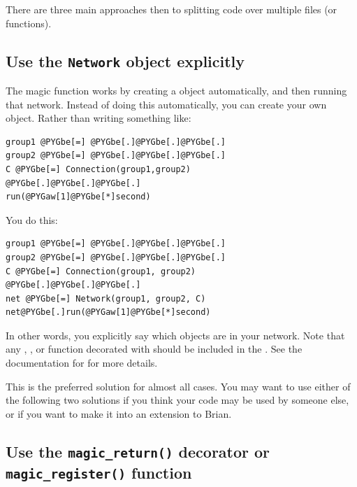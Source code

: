 \documentclass[letterpaper,10pt,english]{manual}
\begin{document}
There are three main approaches then to splitting code over multiple
files (or functions).

\hypertarget{index-112}{}\subsection{Use the \texttt{Network} object explicitly}

The magic \hyperlink{brian.run}{} function works by creating a \hyperlink{brian.Network}{}
object automatically, and then running that network. Instead of doing
this automatically, you can create your own \hyperlink{brian.Network}{} object.
Rather than writing something like:

\begin{Verbatim}[commandchars=@\[\]]
group1 @PYGbe[=] @PYGbe[.]@PYGbe[.]@PYGbe[.]
group2 @PYGbe[=] @PYGbe[.]@PYGbe[.]@PYGbe[.]
C @PYGbe[=] Connection(group1,group2)
@PYGbe[.]@PYGbe[.]@PYGbe[.]
run(@PYGaw[1]@PYGbe[*]second)
\end{Verbatim}

You do this:

\begin{Verbatim}[commandchars=@\[\]]
group1 @PYGbe[=] @PYGbe[.]@PYGbe[.]@PYGbe[.]
group2 @PYGbe[=] @PYGbe[.]@PYGbe[.]@PYGbe[.]
C @PYGbe[=] Connection(group1, group2)
@PYGbe[.]@PYGbe[.]@PYGbe[.]
net @PYGbe[=] Network(group1, group2, C)
net@PYGbe[.]run(@PYGaw[1]@PYGbe[*]second)
\end{Verbatim}

In other words, you explicitly say which objects are in your network.
Note that any \hyperlink{brian.NeuronGroup}{}, \hyperlink{brian.Connection}{},  or
function decorated with \hyperlink{brian.network_operation}{} should be included in the
\hyperlink{brian.Network}{}. See the documentation for \hyperlink{brian.Network}{} for more details.

This is the preferred solution for almost all cases. You may want to use either
of the following two solutions if you think your code may be used by someone
else, or if you want to make it into an extension to Brian.

\subsection{Use the \texttt{magic\_return()} decorator or \texttt{magic\_register()} function}
\end{document}
